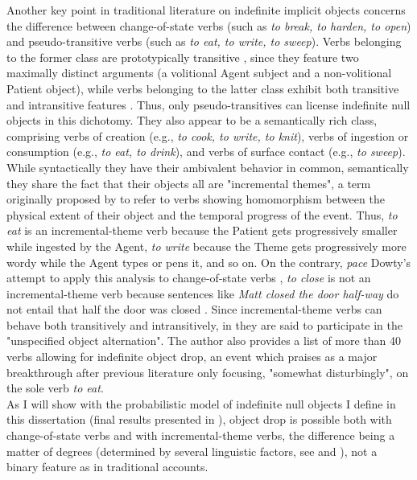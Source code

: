 Another key point in traditional literature on indefinite implicit objects concerns the difference between change-of-state verbs (such as \textit{to break, to harden, to open}) and pseudo-transitive verbs (such as \textit{to eat, to write, to sweep}). Verbs belonging to the former class are prototypically transitive \parencite{HopperThompson1980, Kardos2010, lemmens2006}, since they feature two maximally distinct arguments (a volitional Agent subject and a non-volitional Patient object), while verbs belonging to the latter class exhibit both transitive and intransitive features \parencite{Armstrong2011}. Thus, only pseudo-transitives can license indefinite null objects in this dichotomy. They also appear to be a semantically rich class, comprising verbs of creation (e.g., \textit{to cook, to write, to knit}), verbs of ingestion or consumption (e.g., \textit{to eat, to drink}), and verbs of surface contact (e.g., \textit{to sweep}). While syntactically they have their ambivalent behavior in common, semantically they share the fact that their objects all are "incremental themes", a term originally proposed by \textcite{dowty1991thematic} to refer to verbs showing homomorphism between the physical extent of their object and the temporal progress of the event. Thus, \textit{to eat} is an incremental-theme verb because the Patient gets progressively smaller while ingested by the Agent, \textit{to write} because the Theme gets progressively more wordy while the Agent types or pens it, and so on. On the contrary, \textit{pace} Dowty's attempt to apply this analysis to change-of-state verbs \parencite[568]{dowty1991thematic}, \textit{to close} is not an incremental-theme verb because sentences like \textit{Matt closed the door half-way} do not entail that half the door was closed \parencite[279]{RappaportHovavLevin2005}. Since incremental-theme verbs can behave both transitively and intransitively, in \textcite[33]{Levin1993} they are said to participate in the "unspecified object alternation". The author also provides a list of more than 40 verbs allowing for indefinite object drop, an event which \textcite[116]{Dvorak2017} praises as a major breakthrough after previous literature only focusing, "somewhat disturbingly", on the sole verb \textit{to eat}.\\
As I will show with the probabilistic model of indefinite null objects I define in this dissertation (final results presented in ), object drop is possible both with change-of-state verbs and with incremental-theme verbs, the difference being a matter of degrees (determined by several linguistic factors, see  and ), not a binary feature as in traditional accounts.


